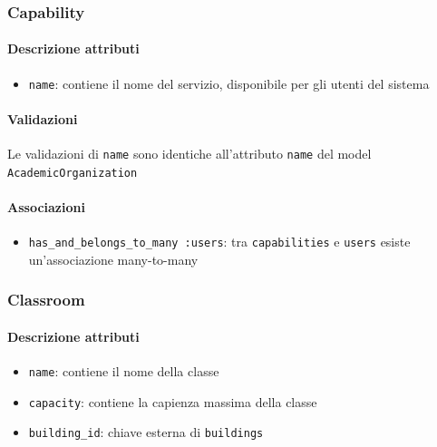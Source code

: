 \documentclass[11pt,a4paper]{article}
\begin{document}
\subsubsection{Capability}
\paragraph{Descrizione attributi}
\begin{itemize}
 \item \verb|name|: contiene il nome del servizio, disponibile per gli utenti del sistema
\end{itemize}
\paragraph{Validazioni}
Le validazioni di \verb|name| sono identiche all'attributo \verb|name| del model \verb|AcademicOrganization|
\paragraph{Associazioni}
\begin{itemize}
 \item \verb|has_and_belongs_to_many :users|: tra \verb|capabilities| e \verb|users| esiste un'associazione many-to-many
\end{itemize}
\subsubsection{Classroom}
\paragraph{Descrizione attributi}
\begin{itemize}
 \item \verb|name|: contiene il nome della classe
 \item \verb|capacity|: contiene la capienza massima della classe
 \item \verb|building_id|: chiave esterna di \verb|buildings|	
\end{itemize}
\end{document}
